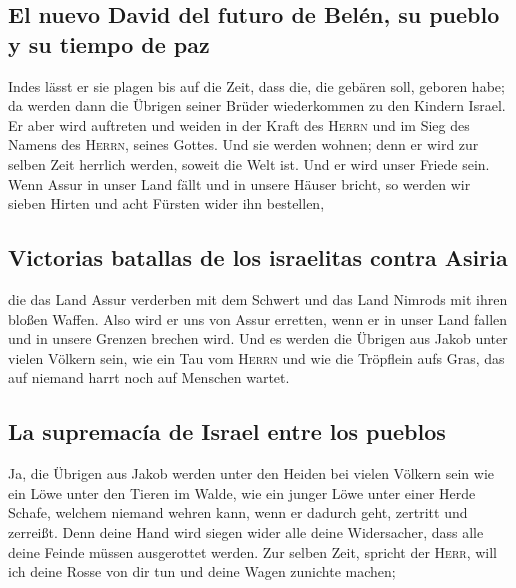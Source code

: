 \hypertarget{el-nuevo-david-del-futuro-de-beluxe9n-su-pueblo-y-su-tiempo-de-paz}{%
\subsection{El nuevo David del futuro de Belén, su pueblo y su tiempo de
paz}\label{el-nuevo-david-del-futuro-de-beluxe9n-su-pueblo-y-su-tiempo-de-paz}}

 Indes lässt er sie plagen bis auf die Zeit, dass die, die
gebären soll, geboren habe; da werden dann die Übrigen seiner Brüder
wiederkommen zu den Kindern Israel.  Er aber wird
auftreten und weiden in der Kraft des \textsc{Herrn} und im Sieg des
Namens des \textsc{Herrn}, seines Gottes. Und sie werden wohnen; denn er
wird zur selben Zeit herrlich werden, soweit die Welt ist.
 Und er wird unser Friede sein. Wenn Assur in unser Land
fällt und in unsere Häuser bricht, so werden wir sieben Hirten und acht
Fürsten wider ihn bestellen,

\hypertarget{victorias-batallas-de-los-israelitas-contra-asiria}{%
\subsection{Victorias batallas de los israelitas contra
Asiria}\label{victorias-batallas-de-los-israelitas-contra-asiria}}

 die das Land Assur verderben mit dem Schwert und das Land
Nimrods mit ihren bloßen Waffen. Also wird er uns von Assur erretten,
wenn er in unser Land fallen und in unsere Grenzen brechen wird.
 Und es werden die Übrigen aus Jakob unter vielen Völkern
sein, wie ein Tau vom \textsc{Herrn} und wie die Tröpflein aufs Gras,
das auf niemand harrt noch auf Menschen wartet.

\hypertarget{la-supremacuxeda-de-israel-entre-los-pueblos}{%
\subsection{La supremacía de Israel entre los
pueblos}\label{la-supremacuxeda-de-israel-entre-los-pueblos}}

 Ja, die Übrigen aus Jakob werden unter den Heiden bei
vielen Völkern sein wie ein Löwe unter den Tieren im Walde, wie ein
junger Löwe unter einer Herde Schafe, welchem niemand wehren kann, wenn
er dadurch geht, zertritt und zerreißt.  Denn deine Hand
wird siegen wider alle deine Widersacher, dass alle deine Feinde müssen
ausgerottet werden.  Zur selben Zeit, spricht der
\textsc{Herr}, will ich deine Rosse von dir tun und deine Wagen zunichte
machen;

